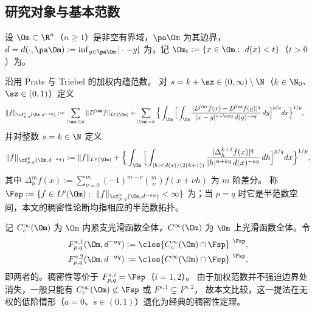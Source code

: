 \subsection{研究对象与基本范数}\label{ss1.1}

设 $\Om\subset\R^n$（$n\ge1$）是非空有界域，$\pa\Om$ 为其边界，
$d=d(\cdot,\pa\Om):=\inf_{y\in\pa\Om}|\cdot-y|$ 为，记
$\Om_t:=\{x\in\Om:\ d(x)<t\}$（$t>0$）为。

沿用 Prats \cite{p2019} 与 Triebel \cite{t2008,t2010} 的加权内蕴范数。
对 $s=k+\sz\in(0,\infty)\setminus\N$（$k\in\N_0$、$\sz\in(0,1)$）定义
\begin{equation}\label{eq:frac-norm}
\begin{split}
  \|f\|_{\cf^s_{p,q}(\Om,d^{-aq})}
  &:=\sum_{|\az|\le k}\|D^{\az}f\|_{L^p(\Om)}
  +\sum_{|\bz|=k}\Big\{\int_\Om\Big[\int_\Om
    \frac{|D^\bz f(x)-D^\bz f(y)|^q}
         {|x-y|^{n+\sz q}\,d(y)^{-aq}}\,dy\Big]^{p/q}dx\Big\}^{1/p},
\end{split}
\end{equation}
并对整数 $s=k\in\N$ 定义
\begin{equation}\label{eq:int-norm}
  \|f\|_{\cf^k_{p,q}(\Om,d^{-aq})}
  :=\|f\|_{L^p(\Om)}
  +\Big\{\int_\Om\Big[\int_{|h|<d(x)/(2(k+1))}
    \frac{|\Delta_h^{k+1}f(x)|^q}{|h|^{n+kq}\,d(x)^{-aq}}\,dh\Big]^{p/q}dx\Big\}^{1/p},
\end{equation}
其中 $\Delta_h^{m}f(x):=\sum_{\nu=0}^{m}(-1)^{m-\nu}\binom{m}{\nu}f(x+\nu h)$ 为 $m$ 阶差分。
称 $\Fsp:=\{f\in L^p(\Om):\ \|f\|_{\cf^s_{p,q}(\Om,d^{-aq})}<\infty\}$ 为；当 $p=q$ 时它是半范数空间，本文的稠密性论断均指相应的半范数拓扑。

记 $C_c^\infty(\Om)$ 为 $\Om$ 内紧支光滑函数全体，$C^\infty(\Om)$ 为 $\Om$ 上光滑函数全体。令
\begin{equation}\label{eq:closures}
\begin{aligned}
  F^{s,1}_{p,q}(\Om,d^{-aq})&:=\clos{C_c^\infty(\Om)\cap\Fsp}^{\ \Fsp},\\
  F^{s,2}_{p,q}(\Om,d^{-aq})&:=\clos{C^\infty(\Om)\cap\Fsp}^{\ \Fsp},
\end{aligned}
\end{equation}
即两者的。稠密性等价于 $F^{s,i}_{p,q}=\Fsp$（$i=1,2$）。
由于加权范数并不强迫边界处消失，一般只能有 $C_c^\infty(\Om)\not\subset\Fsp$ 或 $F^{s,1}\subsetneq F^{s,2}$，
故本文比较，这一提法在无权的低阶情形（$a=0$、$s\in(0,1)$）退化为经典的稠密性定理。

